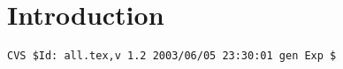 \chapter{Introduction}
\graphicspath{{introduction/figs/}}
\renewcommand{\dirfig}[0]{introduction/figs}
\renewcommand{\dircur}[0]{introduction}



%
%
{\small
\begin{verbatim}CVS $Id: all.tex,v 1.2 2003/06/05 23:30:01 gen Exp $\end{verbatim}
}

